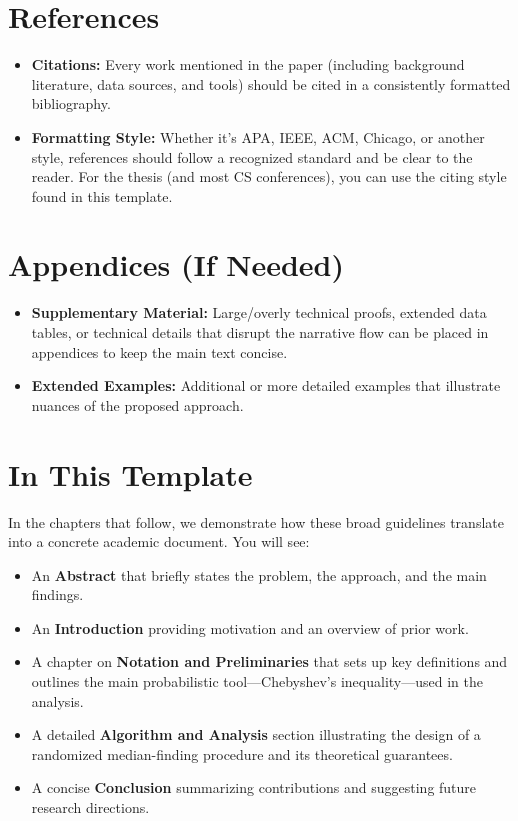 \section{References}
\begin{itemize}
    \item \textbf{Citations:} Every work mentioned in the paper (including background literature, data sources, and tools) should be cited in a consistently formatted bibliography.
    \item \textbf{Formatting Style:} Whether it’s APA, IEEE, ACM, Chicago, or another style, references should follow a recognized standard and be clear to the reader. For the thesis (and most CS conferences), you can use the citing style found in this template.
\end{itemize}

\section{Appendices (If Needed)}
\begin{itemize}
    \item \textbf{Supplementary Material:} Large/overly technical proofs, extended data tables, or technical details that disrupt the narrative flow can be placed in appendices to keep the main text concise.
    \item \textbf{Extended Examples:} Additional or more detailed examples that illustrate nuances of the proposed approach.
\end{itemize}

\section*{In This Template}
In the chapters that follow, we demonstrate how these broad guidelines translate into a concrete academic document. You will see:
\begin{itemize}
    \item An \textbf{Abstract} that briefly states the problem, the approach, and the main findings.
    \item An \textbf{Introduction} providing motivation and an overview of prior work.
    \item A chapter on \textbf{Notation and Preliminaries} that sets up key definitions and outlines the main probabilistic tool—Chebyshev’s inequality—used in the analysis.
    \item A detailed \textbf{Algorithm and Analysis} section illustrating the design of a randomized median-finding procedure and its theoretical guarantees.
    \item A concise \textbf{Conclusion} summarizing contributions and suggesting future research directions.
\end{itemize}

